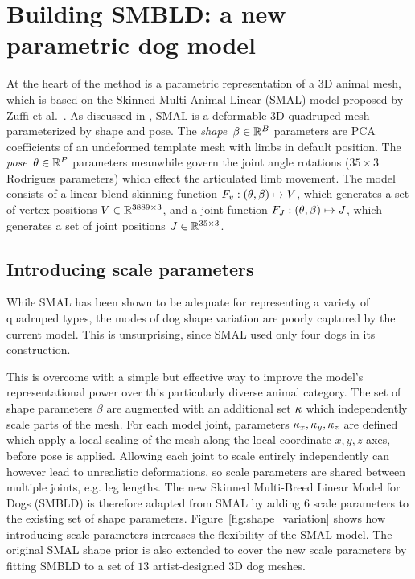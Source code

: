 
\section{Building SMBLD: a new parametric dog model}


At the heart of the method is a parametric representation of a 3D animal mesh, which is based on the Skinned Multi-Animal Linear (SMAL) model proposed by Zuffi et al.~\cite{zuffi2017menagerie}. As discussed in , SMAL is a deformable 3D quadruped mesh parameterized by shape and pose. The \emph{shape}~$\beta \in {\mathbb{R}^{B}}$ parameters are PCA coefficients of an undeformed template mesh with limbs in default position. The \emph{pose}~$\theta \in {\mathbb{R}^{P}}$ parameters meanwhile govern the joint angle rotations ($35 \times 3$ Rodrigues parameters) which effect the articulated limb movement. The model consists of a linear blend skinning function $F_{v}: (\theta, \beta) \mapsto V$, which generates a set of vertex positions $V \in {\mathbb{R}^{3889 \times 3}}$, and a joint function $F_{J}: (\theta, \beta) \mapsto J$, which generates a set of joint positions $J \in {\mathbb{R}^{35 \times 3}}$.

\subsection{Introducing scale parameters}

While SMAL has been shown to be adequate for representing a variety of quadruped types, the modes of dog shape variation are poorly captured by the current model. This is unsurprising, since SMAL used only four dogs in its construction.

This is overcome with a simple but effective way to improve the model's representational power over this particularly diverse animal category. The set of shape parameters $\beta$ are augmented with an additional set $\kappa$ which independently scale parts of the mesh. For each model joint, parameters ${\kappa_x,\kappa_y,\kappa_z}$ are defined which apply a local scaling of the mesh along the local coordinate $x, y, z$ axes, before pose is applied. Allowing each joint to scale entirely independently can however lead to unrealistic deformations, so scale parameters are shared between multiple joints, e.g. leg lengths. The new Skinned Multi-Breed Linear Model for Dogs (SMBLD) is therefore adapted from SMAL by adding $6$ scale parameters to the existing set of shape parameters. Figure~\ref{fig:shape_variation} shows how introducing scale parameters increases the flexibility of the SMAL model. The original SMAL shape prior is also extended to cover the new scale parameters by fitting SMBLD to a set of $13$ artist-designed 3D dog meshes. 

